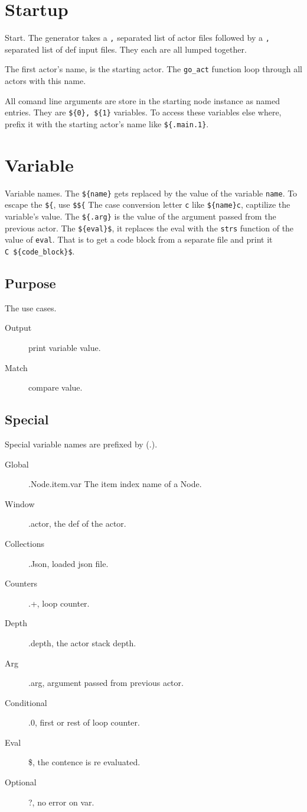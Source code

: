 \documentclass[11pt]{article}
\begin{document}
\section{Startup}
Start.
The generator takes a \texttt{,} separated list of actor files followed
by a \texttt{,} separated list of def input files. They each are all
lumped together.

The first actor's name, is the starting actor. The \texttt{go\_act}
function loop through all actors with this name.

All comand line arguments are store in the starting node instance as
named entries. They are \texttt{\$\{0\},\ \$\{1\}} variables. To access
these variables else where, prefix it with the starting actor's name
like \texttt{\$\{.main.1\}}.
\section{Variable}
Variable names.
The \texttt{\$\{name\}} gets replaced by the value of the variable
\texttt{name}. To escape the \texttt{\$\{}, use \texttt{\$\$\{} The case
conversion letter \texttt{c} like \texttt{\$\{name\}c}, captilize the
variable's value. The \texttt{\$\{.arg\}} is the value of the argument
passed from the previous actor. The \texttt{\$\{eval\}\$}, it replaces
the eval with the \texttt{strs} function of the value of \texttt{eval}.
That is to get a code block from a separate file and print it
\texttt{C\ \$\{code\_block\}\$}.
\subsection{Purpose}
The use cases.
\begin{description}
\item[Output]  print variable value.
\item[Match]  compare value.
\end{description}
\subsection{Special}
Special variable names are prefixed by (.).
\begin{description}
\item[Global]  .Node.item.var The item index name of a Node.
\item[Window]  .actor, the def of the actor.
\item[Collections]  .Json, loaded json file.
\item[Counters]  .+, loop counter.
\item[Depth]  .depth, the actor stack depth.
\item[Arg]  .arg, argument passed from previous actor.
\item[Conditional]  .0, first or rest of loop counter.
\item[Eval]  \$, the contence is re evaluated.
\item[Optional]  ?, no error on var.
\end{description}
\end{document}

